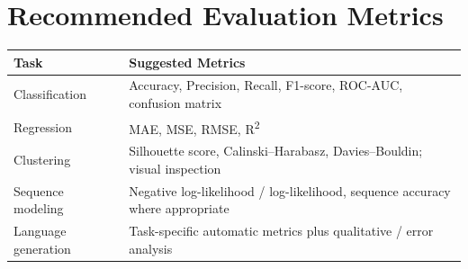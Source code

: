 \section*{Recommended Evaluation Metrics}
{}
\begin{longtable}{|p{}|p{}|}
\hline
\rowcolor{mlblue!8}\textbf{Task} & \textbf{Suggested Metrics} \\
\hline
\endhead
Classification & Accuracy, Precision, Recall, F1-score, ROC-AUC, confusion matrix \\
\hline
Regression & MAE, MSE, RMSE, R\textsuperscript{2} \\
\hline
Clustering & Silhouette score, Calinski--Harabasz, Davies--Bouldin; visual inspection \\
\hline
Sequence modeling & Negative log-likelihood / log-likelihood, sequence accuracy where appropriate \\
\hline
Language generation & Task-specific automatic metrics plus qualitative / error analysis \\
\hline
\end{longtable}
